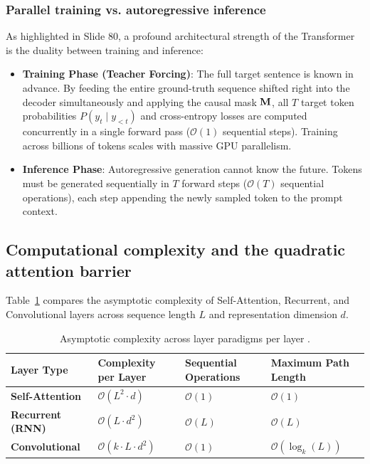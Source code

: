 \documentclass[../../main.tex]{subfiles}
\begin{document}
\subsubsection{Parallel training vs. autoregressive inference}
As highlighted in Slide 80, a profound architectural strength of the Transformer is the duality between training and inference:
\begin{itemize}
    \item \textbf{Training Phase (Teacher Forcing)}: The full target sentence is known in advance. By feeding the entire ground-truth sequence shifted right into the decoder simultaneously and applying the causal mask $\mathbf{M}$, all $T$ target token probabilities $P(y_t \mid y_{<t})$ and cross-entropy losses are computed concurrently in a single forward pass ($\mathcal{O}(1)$ sequential steps). Training across billions of tokens scales with massive GPU parallelism.
    \item \textbf{Inference Phase}: Autoregressive generation cannot know the future. Tokens must be generated sequentially in $T$ forward steps ($\mathcal{O}(T)$ sequential operations), each step appending the newly sampled token to the prompt context.
\end{itemize}

\subsection{Computational complexity and the quadratic attention barrier}
\label{subsec:computational_complexity_ch5}

Table~\ref{tab:layer_complexity_comparison_ch5} compares the asymptotic complexity of Self-Attention, Recurrent, and Convolutional layers across sequence length $L$ and representation dimension $d$.

\begin{table}[htbp]
\centering
\small
\caption{Asymptotic complexity across layer paradigms per layer \cite{vaswani2017}.}
\label{tab:layer_complexity_comparison_ch5}
\begin{tabularx}{\textwidth}{lXXX}
\toprule
\textbf{Layer Type} & \textbf{Complexity per Layer} & \textbf{Sequential Operations} & \textbf{Maximum Path Length} \\
\midrule
\textbf{Self-Attention} & $\mathcal{O}(L^2 \cdot d)$ & $\mathcal{O}(1)$ & $\mathcal{O}(1)$ \\
\textbf{Recurrent (RNN)} & $\mathcal{O}(L \cdot d^2)$ & $\mathcal{O}(L)$ & $\mathcal{O}(L)$ \\
\textbf{Convolutional} & $\mathcal{O}(k \cdot L \cdot d^2)$ & $\mathcal{O}(1)$ & $\mathcal{O}(\log_k(L))$ \\
\bottomrule
\end{tabularx}
\end{table}
\end{document}
